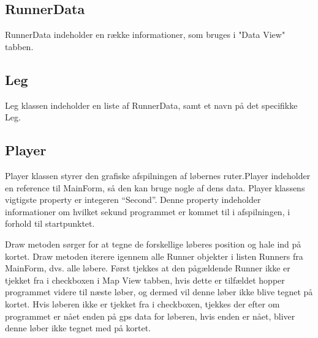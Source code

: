 \subsection{RunnerData}
RunnerData indeholder en række informationer, som bruges i "Data View" tabben.

\subsection{Leg}
Leg klassen indeholder en liste af RunnerData, samt et navn på det specifikke Leg.
\subsection{Player}
Player klassen styrer den grafiske afspilningen af løbernes ruter.Player indeholder en reference til MainForm, så den kan bruge nogle af dens data. \newline
Player klassens vigtigste property er integeren “Second”. Denne property indeholder informationer om hvilket sekund programmet er kommet til i afspilningen, i forhold til startpunktet. 

Draw metoden sørger for at tegne de forskellige løberes position og hale ind på kortet.
Draw metoden iterere igennem alle Runner objekter i listen Runners fra MainForm, dvs. alle løbere.\newline
Først tjekkes at den pågældende Runner ikke er tjekket fra i checkboxen i Map View tabben, hvis dette er tilfældet hopper programmet videre til næste løber, og dermed vil denne løber ikke blive tegnet på kortet. \newline
Hvis løberen ikke er tjekket fra i checkboxen, tjekkes der efter om programmet er nået enden på gps data for løberen, hvis enden er nået, bliver denne løber ikke tegnet med på kortet.

